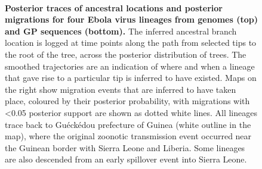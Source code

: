 \documentclass[11pt,oneside,letterpaper]{article}
\begin{document}
\begin{figure}[h]
 \centering
  \\
  \caption{\textbf{Posterior traces of ancestral locations and posterior migrations for four Ebola virus lineages from genomes (top) and GP sequences (bottom).}
  The inferred ancestral branch location is logged at time points along the path from selected tips to the root of the tree, across the posterior distribution of trees.
  The smoothed trajectories are an indication of where and when a lineage that gave rise to a particular tip is inferred to have existed.
  Maps on the right show migration events that are inferred to have taken place, coloured by their posterior probability, with migrations with <0.05 posterior support are shown as dotted white lines.
  All lineages trace back to Gu\'{e}ck\'{e}dou prefecture of Guinea (white outline in the map), where the original zoonotic transmission event occurred near the Guinean border with Sierra Leone and Liberia.
  Some lineages are also descended from an early spillover event into Sierra Leone.
  }
	\label{trace}
\end{figure}
\end{document}
